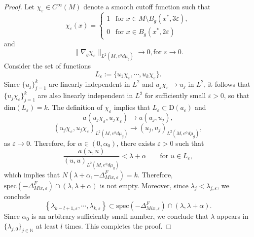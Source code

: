 \documentclass[12pt,a4paper]{amsart}
\numberwithin{equation}{section}
\theoremstyle{plain}
\theoremstyle{definition}
\begin{document}
\begin{proof}
	Let $\chi_\varepsilon\in C^\infty(M)$ denote a smooth cutoff function such that 
	\begin{equation*}
		\chi_\varepsilon(x)=
		\begin{cases}
			1 & \text{for } x\in M\setminus B_g(x^*,3\varepsilon),\\
			0 & \text{for } x\in B_g(x^*,2\varepsilon)
		\end{cases}
	\end{equation*}
	and 
	\begin{equation*}
		\|\nabla_g\chi_\varepsilon\|_{L^2(M,e^\phi d\mu_g)} \rightarrow 0, \text{for } \varepsilon\rightarrow 0.
	\end{equation*}
	Consider the set of functions
	\begin{equation*}
		L_{\varepsilon}:= \{u_{1}\chi_{\varepsilon}, \cdots, u_{k}\chi_{\varepsilon}\}.
	\end{equation*}
	Since $\{u_j\}_{j=1}^k$ are linearly independent in $L^2$ and $u_{j}\chi_{\varepsilon} \rightarrow u_{j}$ in $L^2$, it follows that $\{u_j\chi_{\varepsilon}\}_{j=1}^k$ are also linearly independent in $L^2$ for sufficiently small $\varepsilon>0$, so that $\mathrm{dim}(L_\varepsilon) = k$. The definition of $\chi_{\varepsilon}$ implies that $L_{\varepsilon} \subset \mathrm{D}(a_\varepsilon)$ and 
	\begin{equation*}
		a(u_j\chi_{\varepsilon},u_j\chi_{\varepsilon}) \rightarrow a(u_j,u_j),
	\end{equation*}
	\begin{equation*}
		(u_j\chi_{\varepsilon},u_j\chi_{\varepsilon})_{L^2(M,e^\phi d\mu_g)} \rightarrow (u_j,u_j)_{L^2(M,e^\phi d\mu_g)},
	\end{equation*}
	as $\varepsilon\rightarrow 0$. Therefore, for $\alpha \in (0,\alpha_0)$, there exists $\varepsilon>0$ such that 
	\begin{equation*}
		\frac{a(u,u)}{(u,u)_{L^2(M,e^\phi d\mu_g)}} < \lambda + \alpha \qquad \text{for } u\in L_{\varepsilon},
	\end{equation*}
	which implies that $N(\lambda +\alpha, -\Delta_{Mix,\varepsilon}^F) = k$. Therefore, $\mathrm{spec}(-\Delta_{Mix,\varepsilon}^F)\cap (\lambda,\lambda+\alpha)$ is not empty. Moreover, since $\lambda_j<\lambda_{j,\varepsilon}$, we conclude 
	\begin{equation*}
		\left\{ \lambda_{k - l +1,\varepsilon},\cdots, \lambda_{k,\varepsilon}\right\} \subset \mathrm{spec}(-\Delta_{Mix,\varepsilon}^F)\cap (\lambda,\lambda+\alpha).
	\end{equation*}
	Since $\alpha_0$ is an arbitrary sufficiently small number, we conclude that $\lambda$ appears in $\{\lambda_{j,0}\}_{j\in \mathbb{N}}$ at least $l$ times. This completes the proof.
\end{proof}
\end{document}
